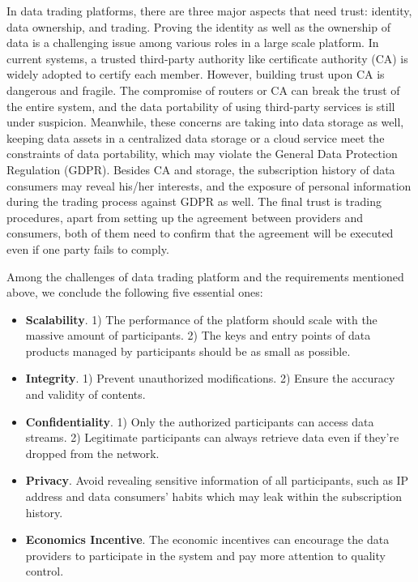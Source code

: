 \begin{spacing}{2.0}
In data trading platforms, there are three major aspects that need trust: identity, data ownership, and trading. Proving the identity as well as the ownership of data is a challenging issue among various roles in a large scale platform. In current systems, a trusted third-party authority like certificate authority (CA) is widely adopted to certify each member. However, building trust upon CA is dangerous and fragile. The compromise of routers or CA can break the trust of the entire system, and the data portability of using third-party services is still under suspicion. Meanwhile, these concerns are taking into data storage as well, keeping data assets in a centralized data storage or a cloud service meet the constraints of data portability, which may violate the General Data Protection Regulation (GDPR)\cite{GDPR}. Besides CA and storage, the subscription history of data consumers may reveal his/her interests, and the exposure of personal information during the trading process against GDPR as well. The final trust is trading procedures, apart from setting up the agreement between providers and consumers, both of them need to confirm that the agreement will be executed even if one party fails to comply.

Among the challenges of data trading platform\cite{BigDataMarket} and the requirements mentioned above, we conclude the following five essential ones:
\begin{itemize}
    \item \textbf{Scalability}.
1) The performance of the platform should scale with the massive amount of participants. 2) The keys and entry points of data products managed by participants should be as small as possible.
    \item \textbf{Integrity}. 1) Prevent unauthorized modifications. 2) Ensure the accuracy and validity of contents.
    \item \textbf{Confidentiality}.
1) Only the authorized participants can access data streams. 2) Legitimate participants can always retrieve data even if they're dropped from the network.
    \item \textbf{Privacy}. Avoid revealing sensitive information of all participants, such as IP address and data consumers' habits which may leak within the subscription history.
    \item \textbf{Economics Incentive}. The economic incentives can encourage the data providers to participate in the system and pay more attention to quality control.
\end{itemize}


\end{spacing}
